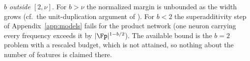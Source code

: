 \emph{$b$ outside $[2,\nu]$.} For $b>\nu$ the normalized margin is unbounded as the width grows (cf.\ the unit-duplication argument of \citealp[Sec.~3.2]{neyshabur2015norm}). For $b<2$ the superadditivity step of Appendix~\ref{app:models} fails for the product network (one neuron carrying every frequency exceeds it by $|\Fp|^{1-b/2}$). The available bound is the $b=2$ problem with a rescaled budget, which is not attained, so nothing about the number of features is claimed there.
